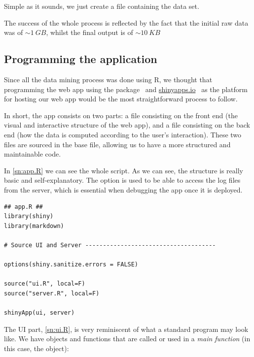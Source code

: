 Simple as it sounds, we just create a  file containing the data set.

The success of the whole process is reflected by the fact that the initial raw data was of $\sim \SI{1}{GB}$, whilst the final output is of $\sim \SI{10}{KB}$


\subsection{Programming the application}

Since all the data mining process was done using R, we thought that programming the web app using the  package~\cite{o:shiny} and \url{shinyapps.io}~\cite{o:shinyapps} as the platform for hosting our web app would be the most straightforward process to follow.

In short, the app consists on two parts: a  file consisting on the front end (the visual and interactive structure of the web app), and a  file consisting on the back end (how the data is computed according to the user's interaction). These two files are sourced in the  base file, allowing us to have a more structured and maintainable code.

In \cref{sn:app.R} we can see the whole  script. As we can see, the structure is really basic and self-explanatory. The  option is used to be able to access the log files from the server, which is essential when debugging the app once it is deployed.

\begin{lstlisting}[label=sn:app.R, caption=Structure of \inline{app.R}]
## app.R ##
library(shiny)
library(markdown)

# Source UI and Server -------------------------------------

options(shiny.sanitize.errors = FALSE)

source("ui.R", local=F)
source("server.R", local=F)

shinyApp(ui, server)
\end{lstlisting}

The UI part, \cref{sn:ui.R}, is very reminiscent of what a standard program may look like. We have objects and functions that are called or used in a \emph{main function} (in this case, the  object):

